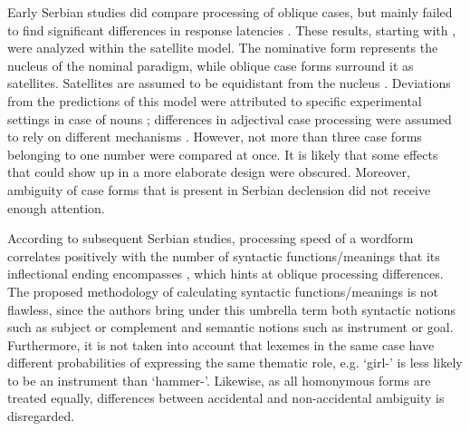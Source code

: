 \documentclass[output=paper, modfonts,newtxmath,hidelinks]{langscibook}
\begin{document}
Early Serbian studies did compare processing of oblique cases, but mainly failed to find significant differences in response latencies \citep{lukatela1978lexical, lukatelaEtAl1980, lukatela1987lexical, katz1987grammatical, kostic1987processing, feldman1987inflected}. These results, starting with \citet{lukatelaEtAl1980}, were analyzed within the satellite model. The nominative form represents the nucleus of the nominal paradigm, while oblique case forms surround it as satellites. Satellites are assumed to be equidistant from the nucleus \citep{feldman1987inflected}. Deviations from the predictions of this model were attributed to specific experimental settings in case of nouns \citep{feldman1987inflected, todorovic1988hemispheric}; differences in adjectival case processing were assumed to rely on different mechanisms \citep{kostic1987processing}. However, not more than three case forms belonging to one number were compared at once. It is likely that some effects that could show up in a more elaborate design were obscured. Moreover, ambiguity of case forms that is present in Serbian declension did not receive enough attention. 

According to subsequent Serbian studies, processing speed of a wordform correlates positively with the number of syntactic functions\slash meanings that its inflectional ending encompasses \citep{kostic1991informational, kostic1995information, kostic2003inflectional, filipovic2003processing,vseva2003annotated}, which hints at oblique processing differences. The proposed methodology of calculating syntactic functions\slash meanings is not flawless, since the authors bring under this umbrella term both syntactic notions such as subject or complement and semantic notions such as instrument or goal. Furthermore, it is not taken into account that lexemes in the same case have different probabilities of expressing the same thematic role, e.g. `girl-\ins' is less likely to be an instrument than `hammer-\ins'. Likewise, as all homonymous forms are treated equally, differences between accidental and non-accidental ambiguity is disregarded.
\end{document}
